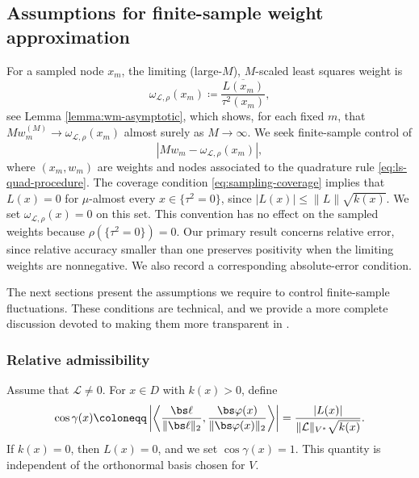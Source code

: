 \documentclass[10pt,dvipsnames]{amsart}
\begin{document}
\subsection{Assumptions for finite-sample weight approximation}
\label{ssec:weight-approximation}

For a sampled node \(x_m\), the limiting (large-$M$), $M$-scaled least squares weight is
\begin{equation}
\label{eq:reference-weight}
    \omega_{\mathcal L, \rho}(x_m)
    \coloneqq
    \frac{\overline{L(x_m)}}{\tau^2(x_m)},
\end{equation}
see Lemma \ref{lemma:wm-asymptotic}, which shows, for each fixed \(m\), that
\(M w_m^{(M)}\to\omega_{\mathcal L,\rho}(x_m)\) almost surely as
\(M\to\infty\). We seek finite-sample control of
\begin{equation}
\label{eq:weight-approximation-error}
    \left|
        M w_m-\omega_{\mathcal L, \rho}(x_m)
    \right|,
\end{equation}
where \( (x_m, w_m) \) are weights and nodes associated to the quadrature rule \eqref{eq:ls-quad-procedure}.
The coverage condition \eqref{eq:sampling-coverage} implies that
\(L(x)=0\) for \(\mu\)-almost every \(x\in\{\tau^2=0\}\), since
\(|L(x)|\leq\|L\|\sqrt{k(x)}\). We set
\(\omega_{\mathcal L,\rho}(x)=0\) on this set. This convention has no
effect on the sampled weights because \(\rho(\{\tau^2=0\})=0\).
Our primary result concerns relative error, since relative accuracy smaller
than one preserves positivity when the limiting weights are nonnegative.
We also record a corresponding absolute-error condition. 

The next sections present the assumptions we require to control finite-sample fluctuations. These conditions are technical, and we provide a more complete discussion devoted to making them more transparent in .

\subsubsection{Relative admissibility}
\label{ssec:assumption}

Assume that \(\mathcal L\neq0\). For \(x\in D\) with \(k(x)>0\), define
\begin{equation}
\label{eq:alignment-angle}
    \cos\gamma(x)
    \coloneqq
    \left|
        \left\langle
            \frac{\bs\ell}{\|\bs\ell\|_2},
            \frac{\bs\varphi(x)}{\|\bs\varphi(x)\|_2}
        \right\rangle
    \right|
    =
    \frac{|L(x)|}
    {\|\mathcal L\|_{V^*}\sqrt{k(x)}}.
\end{equation}
If \(k(x)=0\), then \(L(x)=0\), and we set
\(\cos\gamma(x)=1\). This quantity is independent of the orthonormal basis
chosen for \(V\).
\end{document}
